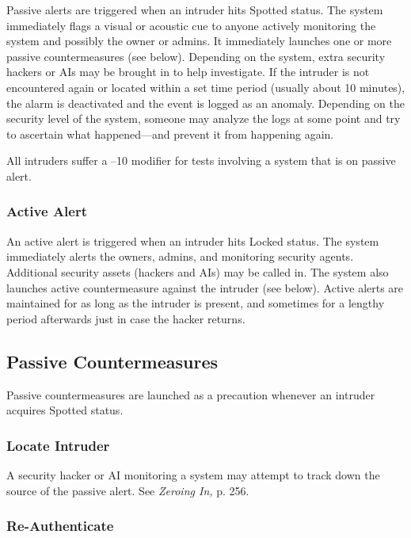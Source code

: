 Passive alerts are triggered when an intruder hits Spotted status. The system immediately flags a visual or acoustic cue to anyone actively monitoring the system and possibly the owner or admins. It immediately launches one or more passive countermeasures (see below). Depending on the system, extra security hackers or AIs may be brought in to help investigate. If the intruder is not encountered again or located within a set time period (usually about 10 minutes), the alarm is deactivated and the event is logged as an anomaly. Depending on the security level of the system, someone may analyze the logs at some point and try to ascertain what happened—and prevent it from happening again. 

All intruders suffer a –10 modifier for tests involving a system that is on passive alert. 

\subsubsection{Active Alert} 

An active alert is triggered when an intruder hits Locked status. The system immediately alerts the owners, admins, and monitoring security agents. Additional security assets (hackers and AIs) may be called in. The system also launches active countermeasure against the intruder (see below). Active alerts are maintained for as long as the intruder is present, and sometimes for a lengthy period afterwards just in case the hacker returns. 

\subsection{Passive Countermeasures} 

Passive countermeasures are launched as a precaution whenever an intruder acquires Spotted status. 

\subsubsection{Locate Intruder} 

A security hacker or AI monitoring a system may attempt to track down the source of the passive alert. See \textit{Zeroing In,} p. 256. 

\subsubsection{Re-Authenticate} 

